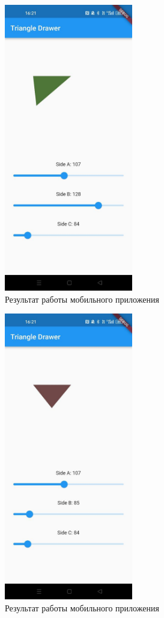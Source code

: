 \documentclass[a4paper, 14pt]{extarticle}
\begin{document}
\begin{figure}[H]
\centering
\includegraphics[width=0.5\textwidth]{images/res1.jpg}
\caption{Результат работы мобильного приложения}
\label{fig:img1}
\end{figure}

\begin{figure}[H]
\centering
\includegraphics[width=0.5\textwidth]{images/res2.jpg}
\caption{Результат работы мобильного приложения}
\label{fig:img2}
\end{figure}
\end{document}
